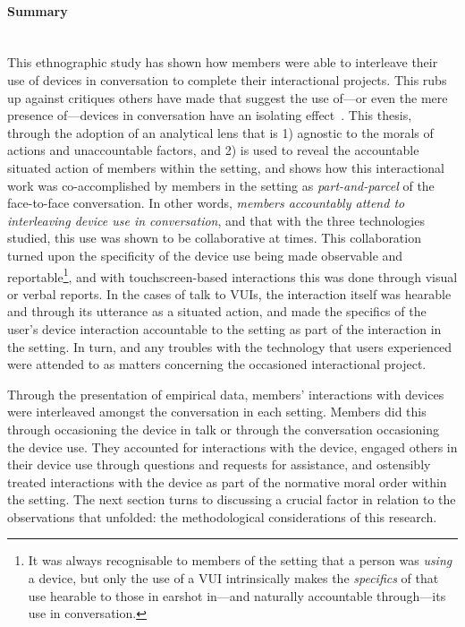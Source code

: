 \begin{revisedsubmission}
\paragraph{Summary} \hfill \\
This ethnographic study has shown how members were able to interleave their use of devices in conversation to complete their interactional projects.
This rubs up against critiques others have made that suggest the use of---or even the mere presence of---devices in conversation have an isolating effect~\citep{Turkle2011}.
This thesis, through the adoption of an analytical lens that is 1) agnostic to the morals of actions and unaccountable factors, and 2) is used to reveal the accountable situated action of members within the setting, and shows how this interactional work was co-accomplished by members in the setting as \textit{part-and-parcel} of the face-to-face conversation.
In other words, \textit{members accountably attend to interleaving device use in conversation}, and that with the three technologies studied, this use was shown to be collaborative at times.
This collaboration turned upon the specificity of the device use being made observable and reportable\footnote{It was always recognisable to members of the setting that a person was \textit{using} a device, but only the use of a \ac{VUI} intrinsically makes the \textit{specifics} of that use hearable to those in earshot in---and naturally accountable through---its use in conversation.}, and with touchscreen-based interactions this was done through visual or verbal reports.
In the cases of talk to \acp{VUI}, the interaction itself was hearable and through its utterance as a situated action,  and made the specifics of the user's device interaction accountable to the setting as part of the interaction in the setting.
In turn, and any troubles with the technology that users experienced were attended to as matters concerning the occasioned interactional project.%

Through the presentation of empirical data, members' interactions with devices were interleaved amongst the conversation in each setting.
Members did this through occasioning the device in talk or through the conversation occasioning the device use.
They accounted for interactions with the device, engaged others in their device use through questions and requests for assistance, and ostensibly treated interactions with the device as part of the normative moral order within the setting.
The next section turns to discussing a crucial factor in relation to the observations that unfolded: the methodological considerations of this research.
\end{revisedsubmission}



